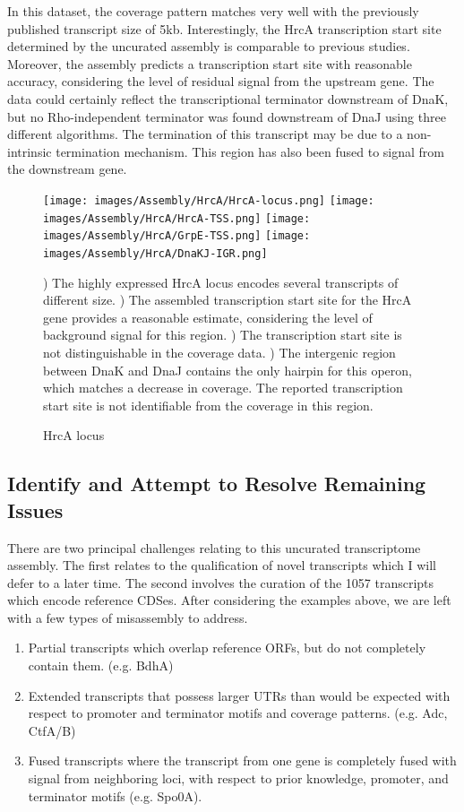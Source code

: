 In this dataset, the coverage pattern matches very well with the previously published transcript size of 5kb. Interestingly, the HrcA transcription start site determined by the uncurated assembly is comparable to previous studies. Moreover, the assembly predicts a transcription start site with reasonable accuracy, considering the level of residual signal from the upstream gene. The data could certainly reflect the transcriptional terminator downstream of DnaK, but no Rho-independent terminator was found downstream of DnaJ using three different algorithms. The termination of this transcript may be due to a non-intrinsic termination mechanism. This region has also been fused to signal from the downstream gene.

\begin{figure}
\small
{\texttt{[image: images/Assembly/HrcA/HrcA-locus.png]}
\label{fig:7a}}
{\texttt{[image: images/Assembly/HrcA/HrcA-TSS.png]}
\label{fig:7b}}
{\texttt{[image: images/Assembly/HrcA/GrpE-TSS.png]}
\label{fig:7c}}
{\texttt{[image: images/Assembly/HrcA/DnaKJ-IGR.png]}
\label{fig:7d}}
\caption{HrcA locus}
) The highly expressed HrcA locus encodes several transcripts of different size. ) The assembled transcription start site for the HrcA gene provides a reasonable estimate, considering the level of background signal for this region. ) The transcription start site is not distinguishable in the coverage data. ) The intergenic region between DnaK and DnaJ contains the only hairpin for this operon, which matches a decrease in coverage. The reported transcription start site is not identifiable from the coverage in this region.
\end{figure}

\subsection{Identify and Attempt to Resolve Remaining Issues}
There are two principal challenges relating to this uncurated transcriptome assembly. The first relates to the qualification of novel transcripts which I will defer to a later time. The second involves the curation of the 1057 transcripts which encode reference CDSes. After considering the examples above, we are left with a few types of misassembly to address.
\begin{enumerate}
\item Partial transcripts which overlap reference ORFs, but do not completely contain them. (e.g. BdhA)
\item Extended transcripts that possess larger UTRs than would be expected with respect to promoter and terminator motifs and coverage patterns. (e.g. Adc, CtfA/B)
\item Fused transcripts where the transcript from one gene is completely fused with signal from neighboring loci, with respect to prior knowledge, promoter, and terminator motifs (e.g. Spo0A).
\end{enumerate}

